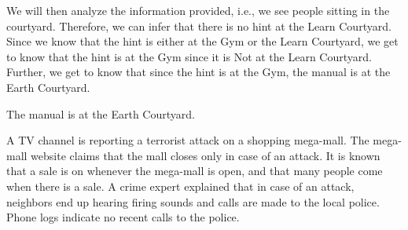 \documentclass[addpoints]{exam}
\begin{document}
\begin{questions}
\begin{solution}
    We will then analyze the information provided, i.e., we see people sitting in the courtyard.
    Therefore, we can infer that there is no hint at the Learn Courtyard. Since we know that the hint 
    is either at the Gym or the Learn Courtyard, we get to know that the hint is at the Gym since it is Not
    at the Learn Courtyard. Further, we get to know that since the hint is at the Gym, the manual is at the Earth Courtyard.

    The manual is at the Earth Courtyard.
  \end{solution}

\question[5] A TV channel is reporting a terrorist attack on a shopping mega-mall. The mega-mall website claims that the mall closes only in case of an attack. It is known that a sale is on whenever the mega-mall is open, and that many people come when there is a sale. A crime expert explained that in case of an attack, neighbors end up hearing firing sounds and calls are made to the local police. Phone logs indicate no recent calls to the police.
\end{questions}
\end{document}
